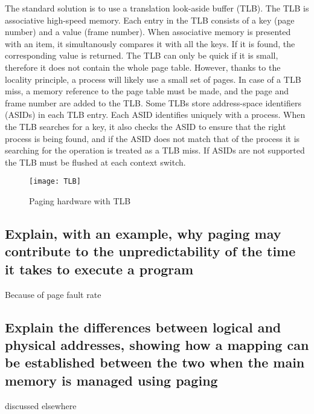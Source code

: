 \documentclass{article}
\begin{document}
The standard solution is to use a translation look-aside buffer (TLB). The TLB is associative high-speed memory. Each entry in the TLB consists of a key (page number) and a value (frame number). When associative memory is presented with an item, it simultanously compares it with all the keys. If it is found, the corresponding value is returned. The TLB can only be quick if it is small, therefore it does not contain the whole page table. However, thanks to the locality principle, a process will likely use a small set of pages. In case of a TLB miss, a memory reference to the page table must be made, and the page and frame number are added to the TLB. Some TLBs store address-space identifiers (ASIDs) in each TLB entry. Each ASID identifies uniquely with a process. When the TLB searches for a key, it also checks the ASID to ensure that the right process is being found, and if the ASID does not match that of the process it is searching for the operation is treated as a TLB miss. If ASIDs are not supported the TLB must be flushed at each context switch.
\begin{figure}[h]
    \centering
    \texttt{[image: TLB]}
    \caption{Paging hardware with TLB}
\end{figure}

\subsection{Explain, with an example, why paging may contribute to the unpredictability of the time it takes to execute a program}
Because of page fault rate

\subsection{Explain the differences between logical and physical addresses, showing how a mapping can be established between the two when the main memory is managed using paging}
discussed elsewhere
\end{document}
